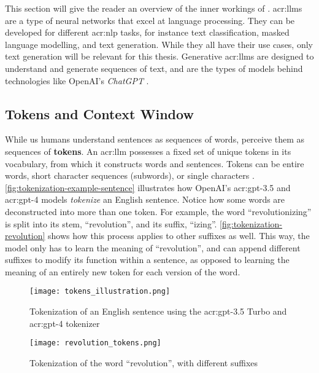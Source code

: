 This section will give the reader an overview of the inner workings of . \glspl{acr:llm} are a type of neural networks that excel at language processing. They can be developed for different \gls{acr:nlp} tasks, for instance text classification, masked language modelling, and text generation. While they all have their use cases, only text generation will be relevant for this thesis. Generative \glspl{acr:llm} are designed to understand and generate sequences of text, and are the types of models behind technologies like OpenAI's \textit{ChatGPT} \citep{openaiIntroducingChatGPT2022}.

\subsection{Tokens and Context Window}
\label{subsec:core-concepts}

While us humans understand sentences as sequences of words,  perceive them as sequences of \textbf{tokens}. An \acrshort{acr:llm} possesses a fixed set of unique tokens in its vocabulary, from which it constructs words and sentences. Tokens can be entire words, short character sequences (subwords), or single characters \citep{aliTokenizerChoiceLLM2024}. \autoref{fig:tokenization-example-sentence} illustrates how OpenAI's \acrshort{acr:gpt}-3.5 and \acrshort{acr:gpt}-4 models \textit{tokenize} an English sentence. Notice how some words are deconstructed into more than one token. For example, the word \enquote{revolutionizing} is split into its stem, \enquote{revolution}, and its suffix, \enquote{izing}. \autoref{fig:tokenization-revolution} shows how this process applies to other suffixes as well. This way, the model only has to learn the meaning of \enquote{revolution}, and can append different suffixes to modify its function within a sentence, as opposed to learning the meaning of an entirely new token for each version of the word.

\begin{figure}[htp]
    \centering
    \texttt{[image: tokens\_illustration.png]}
    \caption{Tokenization of an English sentence using the \acrshort{acr:gpt}-3.5 Turbo and \acrshort{acr:gpt}-4 tokenizer}
    \label{fig:tokenization-example-sentence}
\end{figure}

\begin{figure}[htp]
    \centering
    \texttt{[image: revolution\_tokens.png]}
    \caption{Tokenization of the word \enquote{revolution}, with different suffixes}
    \label{fig:tokenization-revolution}
\end{figure}

